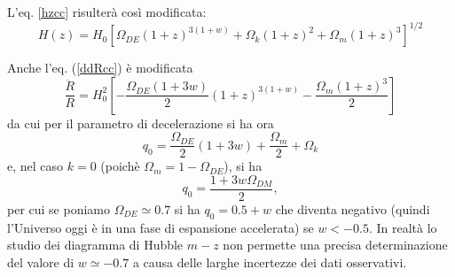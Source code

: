 L'eq. \eqref{hzcc} risulterà così modificata:
\begin{equation}
  H(z)=H_0 \left[ \Omega_{DE} (1+z)^{3(1+w)} + \Omega_{k} (1+z)^2+ \Omega_m
    (1+z)^3 \right]^{1/2}
  \label{hzccX}
\end{equation}

Anche l'eq. (\ref{ddRcc}) è modificata
\begin{equation}
  \frac {\ddot{R}} {R} = H_0^2
  \left[ - \frac{\Omega_{DE} (1+3w)}{2} (1+z)^{3(1+w)}
    -\frac {\Omega_m (1+z)^3} {2 } \right]
  \label {ddRw}
\end{equation}
da cui per il parametro di decelerazione si ha ora
\begin{equation}
  q_0= \frac{\Omega_{DE}}{2} (1+3w) +  \frac{\Omega_m}{2} + \Omega_{k}
\end{equation}
e, nel caso $k=0$ (poichè $\Omega_m = 1 - \Omega_{DE}$), si ha
\begin{equation}
  q_0= \frac {1+3w \Omega_{DM}}{2},
\end{equation}
per cui se poniamo $\Omega_{DE} \simeq 0.7$ si ha $q_0 =0.5+w$ che diventa
negativo (quindi l'Universo oggi è in una fase di espansione accelerata) se
$w<-0.5$.  In realtà lo studio dei diagramma di Hubble $m-z$ non permette una
precisa determinazione del valore di $w \simeq -0.7$ a causa delle larghe
incertezze dei dati osservativi.


